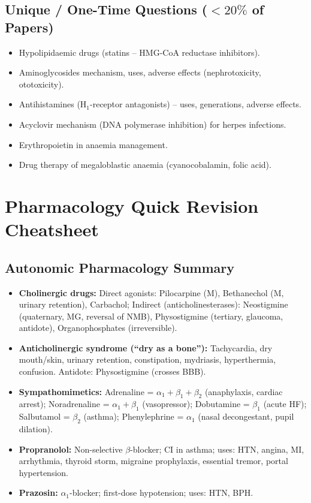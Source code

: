 \documentclass[11pt,a4paper]{article}
\begin{document}
\subsection{Unique / One-Time Questions ($<20\%$ of Papers)}
\begin{itemize}[leftmargin=*]
    \item Hypolipidaemic drugs (statins -- HMG-CoA reductase inhibitors).
    \item Aminoglycosides mechanism, uses, adverse effects (nephrotoxicity, ototoxicity).
    \item Antihistamines (H$_1$-receptor antagonists) -- uses, generations, adverse effects.
    \item Acyclovir mechanism (DNA polymerase inhibition) for herpes infections.
    \item Erythropoietin in anaemia management.
    \item Drug therapy of megaloblastic anaemia (cyanocobalamin, folic acid).
\end{itemize}

\newpage
\appendix
\section{Pharmacology Quick Revision Cheatsheet}

\subsection{Autonomic Pharmacology Summary}
\begin{itemize}[leftmargin=*]
    \item \textbf{Cholinergic drugs:} Direct agonists: Pilocarpine (M), Bethanechol (M, urinary retention), Carbachol; Indirect (anticholinesterases): Neostigmine (quaternary, MG, reversal of NMB), Physostigmine (tertiary, glaucoma, antidote), Organophosphates (irreversible).
    \item \textbf{Anticholinergic syndrome (``dry as a bone''):} Tachycardia, dry mouth/skin, urinary retention, constipation, mydriasis, hyperthermia, confusion. Antidote: Physostigmine (crosses BBB).
    \item \textbf{Sympathomimetics:} Adrenaline = $\alpha_1 + \beta_1 + \beta_2$ (anaphylaxis, cardiac arrest); Noradrenaline = $\alpha_1 + \beta_1$ (vasopressor); Dobutamine = $\beta_1$ (acute HF); Salbutamol = $\beta_2$ (asthma); Phenylephrine = $\alpha_1$ (nasal decongestant, pupil dilation).
    \item \textbf{Propranolol:} Non-selective $\beta$-blocker; CI in asthma; uses: HTN, angina, MI, arrhythmia, thyroid storm, migraine prophylaxis, essential tremor, portal hypertension.
    \item \textbf{Prazosin:} $\alpha_1$-blocker; first-dose hypotension; uses: HTN, BPH.
\end{itemize}
\end{document}
